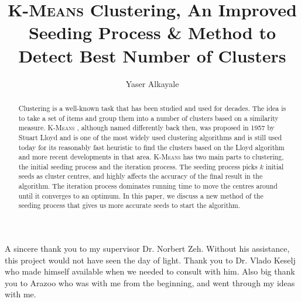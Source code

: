 \documentclass[12pt]{dalthesis}
\newcommand*{\kmeans}{\textsc{K-Means} } %
\DeclarePairedDelimiter\abs{\lvert}{\rvert}
\DeclarePairedDelimiter\norm{\lVert}{\rVert}
\begin{document}
\makeatletter
\let\oldabs\abs
\def\abs{\@ifstar{\oldabs}{\oldabs*}}
\let\oldnorm\norm
\def\norm{\@ifstar{\oldnorm}{\oldnorm*}}
\def\BState{\State\hskip-\ALG@thistlm}
\makeatother

\title{\kmeans Clustering, An Improved Seeding Process \& Method to Detect Best Number of Clusters } %
\author{Yaser Alkayale}
\bcshon  %

\nolistoftables
\nolistoffigures

\frontmatter

\begin{abstract}
  Clustering is a well-known task that has been studied and used for decades. The idea is to take a set of items and group them into a number of clusters based on a similarity measure. \kmeans, although named differently back then, was proposed in 1957 by Stuart Lloyd and is one of the most widely used clustering algorithms and is still used today for its reasonably fast heuristic to find the clusters based on the Lloyd algorithm and more recent developments in that area. \kmeans has two main parts to clustering, the initial seeding process and the iteration process. The seeding process picks $k$ initial seeds as cluster centres, and highly affects the accuracy of the final result in the algorithm. The iteration process dominates running time to move the centres around until it converges to an optimum. In this paper, we discuss a new method of the seeding process that gives us more accurate seeds to start the algorithm. 

\end{abstract}



\begin{acknowledgements} 
  A sincere thank you to my supervisor Dr. Norbert Zeh. Without his assistance, this project would not have seen the day of light. Thank you to Dr. Vlado Keselj who made himself available when we needed to consult with him. Also big thank you to Arazoo who was with me from the beginning, and went through my ideas with me.
\end{acknowledgements}
\end{document}
